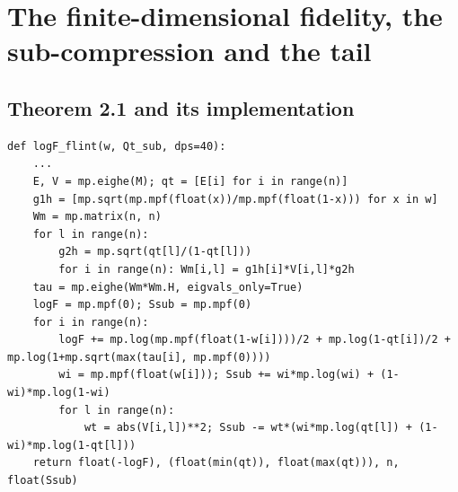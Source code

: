 \documentclass[11pt]{article}
\newcommand{\file}[1]{\texttt{\detokenize{#1}}}
\begin{document}
\section{The finite-dimensional fidelity, the sub-compression and the tail}\label{sec:fid}

\subsection{Theorem 2.1 and its implementation}

\begin{lstlisting}[caption={\file{numerics/fidelity_flint.py}, lines 11--31 (abridged)},captionpos=b,firstnumber=11]
def logF_flint(w, Qt_sub, dps=40):
    ...
    E, V = mp.eighe(M); qt = [E[i] for i in range(n)]
    g1h = [mp.sqrt(mp.mpf(float(x))/mp.mpf(float(1-x))) for x in w]
    Wm = mp.matrix(n, n)
    for l in range(n):
        g2h = mp.sqrt(qt[l]/(1-qt[l]))
        for i in range(n): Wm[i,l] = g1h[i]*V[i,l]*g2h
    tau = mp.eighe(Wm*Wm.H, eigvals_only=True)
    logF = mp.mpf(0); Ssub = mp.mpf(0)
    for i in range(n):
        logF += mp.log(mp.mpf(float(1-w[i])))/2 + mp.log(1-qt[i])/2 + mp.log(1+mp.sqrt(max(tau[i], mp.mpf(0))))
        wi = mp.mpf(float(w[i])); Ssub += wi*mp.log(wi) + (1-wi)*mp.log(1-wi)
        for l in range(n):
            wt = abs(V[i,l])**2; Ssub -= wt*(wi*mp.log(qt[l]) + (1-wi)*mp.log(1-qt[l]))
    return float(-logF), (float(min(qt)), float(max(qt))), n, float(Ssub)
\end{lstlisting}
\end{document}

